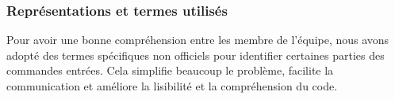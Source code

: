 \documentclass[12pt]{article}
\begin{document}

\subsubsection{Représentations et termes utilisés}
Pour avoir une bonne compréhension entre les membre de l'équipe, nous avons adopté des termes spécifiques non officiels pour identifier certaines parties des commandes entrées. Cela simplifie beaucoup le problème, facilite la communication et améliore la lisibilité et la compréhension du code.
\end{document}
